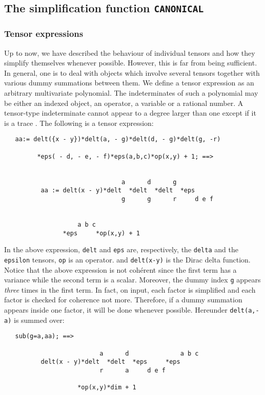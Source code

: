\subsection{The simplification function \texttt{CANONICAL}}

\subsubsection{Tensor expressions}
Up to now, we have described the behaviour of individual
tensors and how they simplify themselves whenever possible.
However, this is far from being sufficient. In general, one is
to deal with objects which involve several tensors together
with various dummy summations between them.
We define a tensor expression as an arbitrary multivariate
polynomial. The indeterminates of such a polynomial may be
either an indexed object, an operator, a variable or a rational number.
A tensor-type indeterminate cannot appear to a degree larger
than one except if it is a trace%
.
The following is a tensor expression:
\begin{verbatim}
   aa:= delt({x - y})*delt(a, - g)*delt(d, - g)*delt(g, -r)

         *eps( - d, - e, - f)*eps(a,b,c)*op(x,y) + 1; ==>


                                a      d      g
          aa := delt(x - y)*delt  *delt  *delt  *eps
                                g      g      r     d e f


                    a b c
                *eps     *op(x,y) + 1
\end{verbatim}
In the above expression, \texttt{delt} and \texttt{eps} are, respectively, the
\texttt{delta} and the \texttt{epsilon} tensors,
\texttt{op} is an operator.
and \texttt{delt(x-y)} is the Dirac delta function.
Notice that the above expression is not coh\'erent since the first term
has a variance while the second term is a scalar. Moreover, the
dummy index \texttt{g} appears \emph{three} times in the first term.
In fact, on input, each factor  is simplified   and each
factor is checked for coherence not more.
Therefore, if a dummy summation  appears inside one factor, it will
be done whenever possible. Hereunder \texttt{delt(a,-a)} is
summed over:
\begin{verbatim}
   sub(g=a,aa); ==>

                          a      d              a b c
          delt(x - y)*delt  *delt  *eps     *eps
                          r      a     d e f

                    *op(x,y)*dim + 1
\end{verbatim}

